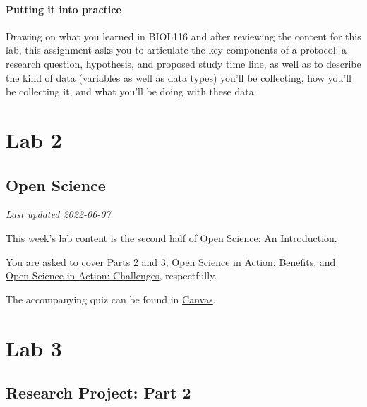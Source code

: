 \documentclass[
]{book}
\begin{document}
\hypertarget{putting-it-into-practice}{%
\subsection*{Putting it into practice}\label{putting-it-into-practice}}

Drawing on what you learned in BIOL116 and after reviewing the content for this lab, this assignment asks you to articulate the key components of a protocol: a research question, hypothesis, and proposed study time line, as well as to describe the kind of data (variables as well as data types) you'll be collecting, how you'll be collecting it, and what you'll be doing with these data.

\hypertarget{part-lab-2}{%
\part*{Lab 2}\label{part-lab-2}}

\hypertarget{open-science}{%
\chapter*{Open Science}\label{open-science}}

\emph{Last updated 2022-06-07}

This week's lab content is the second half of \href{https://ubco-biology.github.io/OS-Introduction/}{Open Science: An Introduction}.

You are asked to cover Parts 2 and 3, \href{https://ubco-biology.github.io/OS-Introduction/open-science-in-action-benefits.html}{Open Science in Action: Benefits}, and \href{https://ubco-biology.github.io/OS-Introduction/open-science-in-action-challenges.html}{Open Science in Action: Challenges}, respectfully.

The accompanying quiz can be found in \href{https://canvas.ubc.ca/courses/90147}{Canvas}.

\hypertarget{part-lab-3}{%
\part*{Lab 3}\label{part-lab-3}}

\hypertarget{research-project-part-2}{%
\chapter*{Research Project: Part 2}\label{research-project-part-2}}
\end{document}
